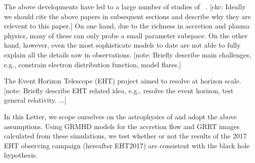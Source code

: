 \documentclass[twocolumn,tighten,dvipsnames]{aastex63}
\newcommand\note[1]{{\color{OliveGreen}[note: #1]}}
\newcommand\ckc[1]{{\color{MidnightBlue}[ckc: #1]}}
\begin{document}

The above developments have led to a large number of studies of
\sgra~\citep[e.g.,][]{2006MNRAS.370..219M, 2007MNRAS.379.1519M,
  2009A&A...508L..13M, 2009ApJ...698..676D, 2009ApJ...701..521C,
  2009ApJ...706..497M, 2012ApJ...746L..10D, 2012MNRAS.421.1315Z,
  2013A&A...559L...3M, 2014A&A...570A...7M, 2014ApJ...790....1B,
  2015A&A...576A..41B, 2015ApJ...799....1C, 2015ApJ...802...69B,
  2015ApJ...812..103C, 2015Sci...350.1242J, 2016A&A...588A..57F,
  2016ApJ...817..173L, 2016ApJ...824...40O, 2016ApJ...826...77B,
  2016ApJ...831....4P, 2016MNRAS.455.2187M, 2017ApJ...837..180G,
  2017ApJ...844...35M, 2017ApJ...851..148M, 2017MNRAS.467.3604R,
  2018A&A...612A..34D, 2018ApJ...856..163M, 2018ApJ...859...60L,
  2018ApJ...863..148P, 2018ApJ...865..104J, 2018ApJ...868..101B,
  2018JCAP...07..015H, 2018MNRAS.478.1875J, 2018MNRAS.478.5209C,
  2019ApJ...881L...2B, 2019ApJ...884..148B, 2019ApJ...886...96H,
  2020ApJ...896L...6R, 2020ApJ...897...99T, 2020MNRAS.492.3272R,
  2020MNRAS.493.1404A, 2020MNRAS.494.4168D, 2020MNRAS.494.5923P,
  2020arXiv200514251B, 2020MNRAS.497.4999D, 2020arXiv200603658P,
  2020ApJ...896L...6R}.
\ckc{Ideally we should cite the above papers in subsequent sections
  and describe why they are relevent to this paper.}
On one hand, due to the richness in accretion and plasma physics, many
of these can only probe a small parameter subspace.
On the other hand, however, even the most sophisticate models to date
are not able to fully explain all the details saw in observations.
\note{Briefly describe main challenges, e.g., constrain electron
  distribution function, model flares.}


The Event Horizon Telescope (EHT) project aimed to resolve \sgra at
horizon scale.
\note{Briefly describe EHT related idea, e.g., resolve the event
  horizon, test general relativity.
  ...}

In this Letter, we scope ourselves on the astrophysics of \sgra and
adopt the above assumptions.
Using GRMHD models for the accretion flow and GRRT images calculated
from these simulations, we test whether or not the results of the 2017
EHT observing campaign (hereafter EHT2017) are consistent with the
black hole hypothesis.
\end{document}

